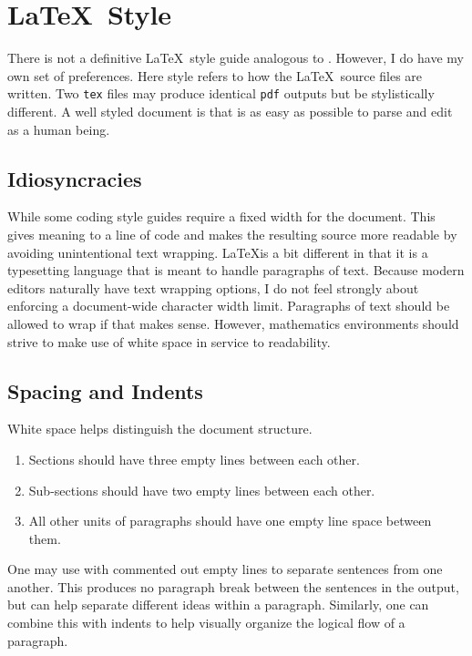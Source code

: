 
\section{\texorpdfstring{\LaTeX\ Style}{LaTeX Style}}

There is not a definitive \LaTeX\ style guide analogous to . However, I do have my own set of preferences. Here style refers to how the \LaTeX\ source files are written. Two \texttt{tex} files may produce identical \texttt{pdf} outputs but be stylistically different. A well styled document is that is as easy as possible to parse and edit as a human being.


\subsection{Idiosyncracies}

While some coding style guides require a fixed width for the document. This gives meaning to a line of code and makes the resulting source more readable by avoiding unintentional text wrapping. \LaTeX is a bit different in that it is a typesetting language that is meant to handle paragraphs of text. Because modern editors naturally have text wrapping options, I do not feel strongly about enforcing a document-wide character width limit. Paragraphs of text should be allowed to wrap if that makes sense. However, mathematics environments should strive to make use of white space in service to readability.


\subsection{Spacing and Indents}

White space helps distinguish the document structure. 

\begin{enumerate}
	\item Sections should have three empty lines between each other.
	\item Sub-sections should have two empty lines between each other.
	\item All other units of paragraphs should have one empty line space between them.
\end{enumerate}
One may use with commented out empty lines to separate sentences from one another. 
% 
	This produces no paragraph break between the sentences in the output, but can help separate different ideas within a paragraph.
% 
	Similarly, one can combine this with indents to help visually organize the logical flow of a paragraph.


